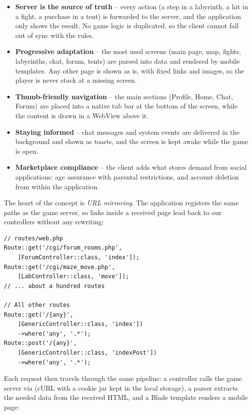 \begin{itemize}
  \item \textbf{Server is the source of truth} -- every action (a step in a labyrinth, a hit in
  a fight, a purchase in a tent) is forwarded to the server, and the application only shows the
  result. No game logic is duplicated, so the client cannot fall out of sync with the rules.

  \item \textbf{Progressive adaptation} -- the most used screens (main page, map, fights,
  labyrinths, chat, forum, tents) are parsed into data and rendered by mobile templates. Any
  other page is shown as is, with fixed links and images, so the player is never stuck at a
  missing screen.

  \item \textbf{Thumb-friendly navigation} -- the main sections (Profile, Home, Chat, Forum) are
  placed into a native tab bar at the bottom of the screen, while the content is drawn in a
  WebView above it.

  \item \textbf{Staying informed} -- chat messages and system events are delivered in the
  background and shown as toasts, and the screen is kept awake while the game is open.

  \item \textbf{Marketplace compliance} -- the client adds what stores demand from social
  applications: age assurance with parental restrictions, and account deletion from within the
  application.
\end{itemize}

\noindent The heart of the concept is \emph{URL mirroring}. The application registers the same
paths as the game server, so links inside a received page lead back to our controllers without
any rewriting:

\begin{lstlisting}
// routes/web.php
Route::get('/cgi/forum_rooms.php',
    [ForumController::class, 'index']);
Route::get('/cgi/maze_move.php',
    [LabController::class, 'move']);
// ... about a hundred routes

// All other routes
Route::get('/{any}',
    [GenericController::class, 'index'])
    ->where('any', '.*');
Route::post('/{any}',
    [GenericController::class, 'indexPost'])
    ->where('any', '.*');
\end{lstlisting}

\noindent Each request then travels through the same pipeline: a controller calls the game server
via  (cURL with a cookie jar kept in the local storage), a parser extracts
the needed data from the received HTML, and a Blade template renders a mobile page:

